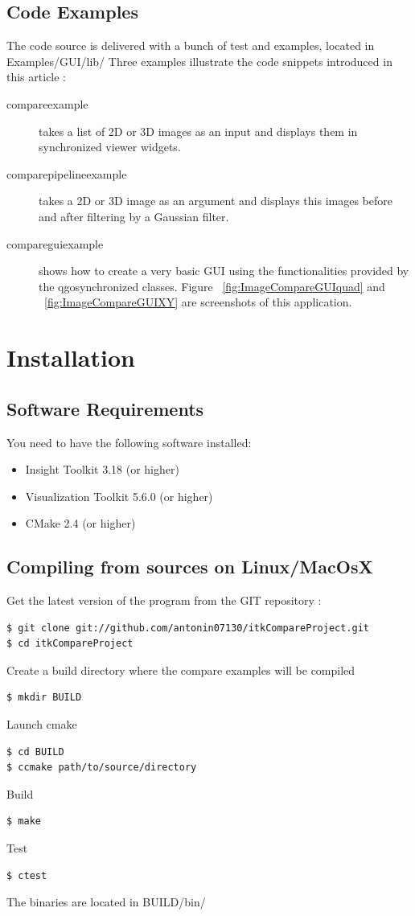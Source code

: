 \documentclass{InsightArticle}
\begin{document}
\subsection*{Code Examples}
The code source is delivered with a bunch of test and examples, located in Examples/GUI/lib/
Three examples illustrate the code snippets introduced in this article :
\begin{description}
  \item [compareexample] takes a list of 2D or 3D images as an input and displays them in synchronized viewer widgets.
  \item [comparepipelineexample] takes a 2D or 3D image as an argument and displays this images before and after filtering by a Gaussian filter. 
  \item [compareguiexample] shows how to create a very basic GUI using the functionalities provided by the qgosynchronized classes. Figure ~\ref{fig:ImageCompareGUIquad} and ~\ref{fig:ImageCompareGUIXY} are screenshots of this application.
\end{description}


\section{Installation}
\subsection*{Software Requirements}
You need to have the following software installed:
\begin{itemize}
  \item  Insight Toolkit 3.18 (or higher)
  \item  Visualization Toolkit 5.6.0 (or higher)
  \item  CMake 2.4 (or higher)
\end{itemize}

\subsection*{Compiling from sources on Linux/MacOsX}
Get the latest version of the program from the GIT repository :
\begin{lstlisting}[language=ksh,numbers=none,captionpos=none]
$ git clone git://github.com/antonin07130/itkCompareProject.git 
$ cd itkCompareProject
\end{lstlisting}
Create a build directory where the compare examples will be compiled
\begin{lstlisting}[language=ksh,numbers=none,captionpos=none]
$ mkdir BUILD
\end{lstlisting}
Launch cmake
\begin{lstlisting}[language=ksh,numbers=none,captionpos=none]
$ cd BUILD
$ ccmake path/to/source/directory
\end{lstlisting}
Build
\begin{lstlisting}[language=ksh,numbers=none,captionpos=none]
$ make
\end{lstlisting}
Test
\begin{lstlisting}[language=ksh,numbers=none,captionpos=none]
$ ctest
\end{lstlisting}
The binaries are located in BUILD/bin/ 
\end{document}
